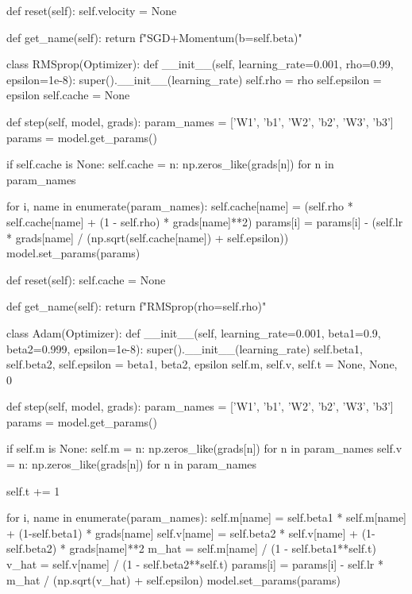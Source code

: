 \documentclass[../../main.tex]{subfiles}
\begin{document}
\begin{pythoncode}
    def reset(self):
        self.velocity = None

    def get_name(self):
        return f"SGD+Momentum(b={self.beta})"


class RMSprop(Optimizer):
    def __init__(self, learning_rate=0.001, rho=0.99, epsilon=1e-8):
        super().__init__(learning_rate)
        self.rho = rho
        self.epsilon = epsilon
        self.cache = None

    def step(self, model, grads):
        param_names = ['W1', 'b1', 'W2', 'b2', 'W3', 'b3']
        params = model.get_params()

        if self.cache is None:
            self.cache = {n: np.zeros_like(grads[n]) for n in param_names}

        for i, name in enumerate(param_names):
            self.cache[name] = (self.rho * self.cache[name] +
                               (1 - self.rho) * grads[name]**2)
            params[i] = params[i] - (self.lr * grads[name] /
                                     (np.sqrt(self.cache[name]) + self.epsilon))
        model.set_params(params)

    def reset(self):
        self.cache = None

    def get_name(self):
        return f"RMSprop(rho={self.rho})"


class Adam(Optimizer):
    def __init__(self, learning_rate=0.001, beta1=0.9, beta2=0.999,
                 epsilon=1e-8):
        super().__init__(learning_rate)
        self.beta1, self.beta2, self.epsilon = beta1, beta2, epsilon
        self.m, self.v, self.t = None, None, 0

    def step(self, model, grads):
        param_names = ['W1', 'b1', 'W2', 'b2', 'W3', 'b3']
        params = model.get_params()

        if self.m is None:
            self.m = {n: np.zeros_like(grads[n]) for n in param_names}
            self.v = {n: np.zeros_like(grads[n]) for n in param_names}

        self.t += 1

        for i, name in enumerate(param_names):
            self.m[name] = self.beta1 * self.m[name] + (1-self.beta1) * grads[name]
            self.v[name] = self.beta2 * self.v[name] + (1-self.beta2) * grads[name]**2
            m_hat = self.m[name] / (1 - self.beta1**self.t)
            v_hat = self.v[name] / (1 - self.beta2**self.t)
            params[i] = params[i] - self.lr * m_hat / (np.sqrt(v_hat) + self.epsilon)
        model.set_params(params)


\end{pythoncode}
\end{document}
